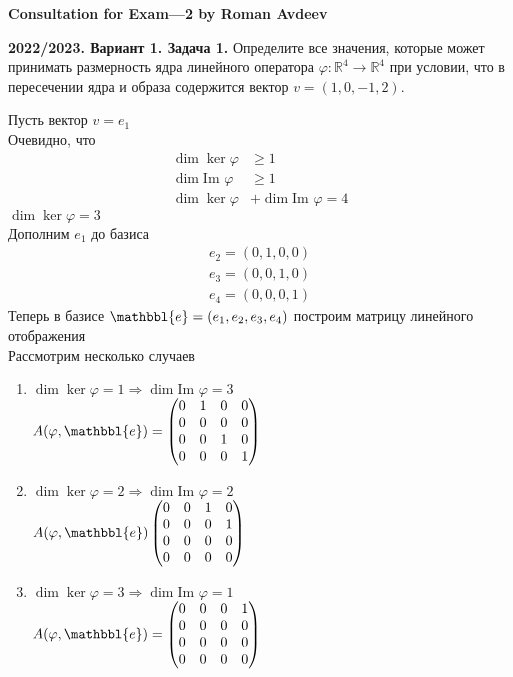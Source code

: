 \documentclass[a4paper]{article}
\newcommand{\e}{\mathbbl{e}}
\newcommand{\im}{\text{Im }}
\begin{document}
\begin{center}
    \LARGE{\textbf{Consultation for Exam—2 by Roman Avdeev}}
\end{center}
\begin{tcolorbox}[colback=blue!20!white, colframe=black!100!black]
    \textbf{2022/2023. Вариант 1. Задача 1.} Определите все значения, которые может принимать размерность ядра линейного оператора $\varphi: \mathbb{R}^{4} \rightarrow \mathbb{R}^{4}$ при условии, что в пересечении ядра и образа содержится вектор $v=(1,0,-1,2)$.
\end{tcolorbox}
Пусть вектор $v=e_1$\\[2mm]
\indent Очевидно, что
$$\begin{aligned}
    \dim{\ker{\varphi}}&\geqslant1\\
    \dim{\im{\varphi}}&\geqslant1\\
    \dim{\ker{\varphi}}&+\dim{\im{\varphi}}=4
\end{aligned}$$
$\dim{\ker{\varphi}}=3$\\[2mm]
\indent Дополним $e_1$ до базиса $$\begin{aligned}
    e_2=(0,1,0,0)\\
    e_3=(0,0,1,0)\\
    e_4=(0,0,0,1)
\end{aligned}$$
Теперь в базисе $\e=(e_1,e_2,e_3,e_4)$ построим матрицу линейного отображения\\[2mm]
Рассмотрим несколько случаев
\begin{enumerate}
    \item $\dim{\ker{\varphi}}=1\Rightarrow\dim{\im{\varphi}}=3$\\[2mm]
    $A(\varphi,\e)=\begin{pmatrix}
    0&1&0&0\\
    0&0&0&0\\
    0&0&1&0\\
    0&0&0&1
\end{pmatrix}$
\item $\dim{\ker{\varphi}}=2\Rightarrow\dim{\im{\varphi}}=2$\\[2mm]
    $A(\varphi,\e)\begin{pmatrix}
    0&0&1&0\\
    0&0&0&1\\
    0&0&0&0\\
    0&0&0&0
\end{pmatrix}$
\item $\dim{\ker{\varphi}}=3\Rightarrow\dim{\im{\varphi}}=1$\\[2mm]
$A(\varphi,\e)=\begin{pmatrix}
    0&0&0&1\\
    0&0&0&0\\
    0&0&0&0\\
    0&0&0&0
\end{pmatrix}$
\end{enumerate}
\newpage
\end{document}
